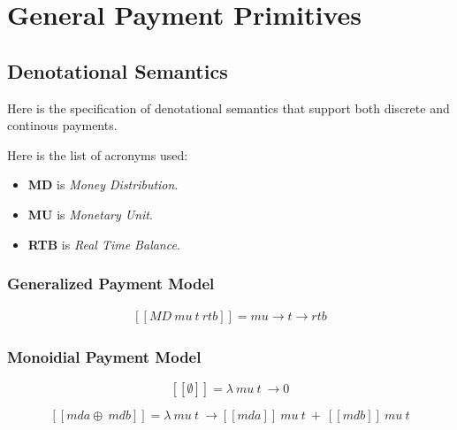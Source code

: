 \documentclass[a4paper,10pt]{report}
\begin{document}
\chapter{General Payment Primitives}

\section{Denotational Semantics}

Here is the specification of denotational semantics that support both discrete and continous payments.

Here is the list of acronyms used:

\begin{itemize}
    \item \textbf{MD} is \textit{Money Distribution}.
    \item \textbf{MU} is \textit{Monetary Unit}.
    \item \textbf{RTB} is \textit{Real Time Balance}.
\end{itemize}

\subsection{Generalized Payment Model}

\begin{equation}\label{sem_transfer}
    \begin{split}
        [\![MD\ mu\ t\ rtb]\!] = mu \rightarrow t \rightarrow rtb
    \end{split}
\end{equation}

\subsection{Monoidial Payment Model}

\begin{equation}\label{sem_mzero}
    [\![\emptyset]\!] = \lambda\ mu\ t\ \rightarrow 0
\end{equation}

\begin{equation}\label{sem_mappend}
    [\![mda \oplus\ mdb]\!] = \lambda\ mu\ t\ \rightarrow
    [\![mda]\!]\ mu\ t\ +\ [\![mdb]\!]\ mu\ t
\end{equation}
\end{document}
